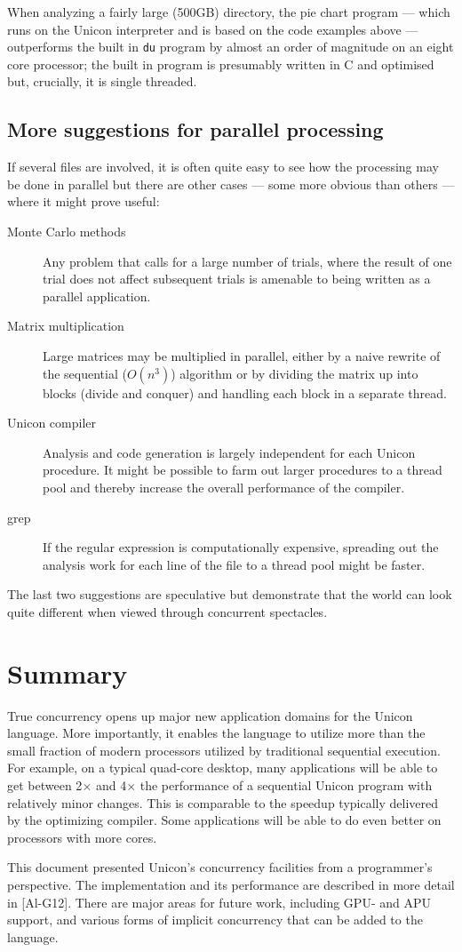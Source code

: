 When analyzing a fairly large (500GB) directory, the pie chart program --- which
runs on the Unicon interpreter and is based on the code examples above ---
outperforms the built in \texttt{du} program by almost an order of magnitude on
an eight core processor; the built in program is presumably written in C and
optimised but, crucially, it is single threaded.

\subsection{More suggestions for parallel processing}
If several files are involved, it is often quite easy to see how the
processing may be done in parallel but there are other cases --- some more
obvious than others --- where it might prove useful:
\begin{description}
\item[Monte Carlo methods]
  Any problem that calls for a large number of trials, where the result
  of one trial does not affect subsequent trials is amenable to being
  written as a parallel application.
\item[Matrix multiplication]
  Large matrices may be multiplied in parallel, either by a naive rewrite of the
  sequential ($O(n^3)$) algorithm or by dividing the matrix up into blocks (divide
  and conquer) and handling each block in a separate thread.
\item[Unicon compiler]
  Analysis and code generation is largely independent for each Unicon
  procedure. It might be possible to farm out larger procedures to a thread pool
  and thereby increase the overall performance of the compiler.
\item[grep]
  If the regular expression is computationally expensive, spreading out the
  analysis work for each line of the file to a thread pool might be faster.
\end{description}
The last two  suggestions are speculative but demonstrate that the world can look
quite different when viewed through concurrent spectacles.




\section{Summary}

True concurrency opens up major new application domains for the Unicon language.
More importantly, it enables the language to utilize more than the small
fraction of modern processors utilized by traditional sequential execution. For
example, on a typical quad-core desktop, many applications will be able to get
between 2$\times$ and 4$\times$ the performance of a sequential Unicon program
with relatively minor changes. This is comparable to the speedup typically
delivered by the optimizing compiler.  Some applications will be able to do even
better on processors with more cores.

This document presented Unicon's concurrency facilities from a programmer's
perspective. The implementation and its performance are described in more detail
in [Al-G12]. There are major areas for future work, including GPU- and APU
support, and various forms of implicit concurrency that can be added to the
language.
